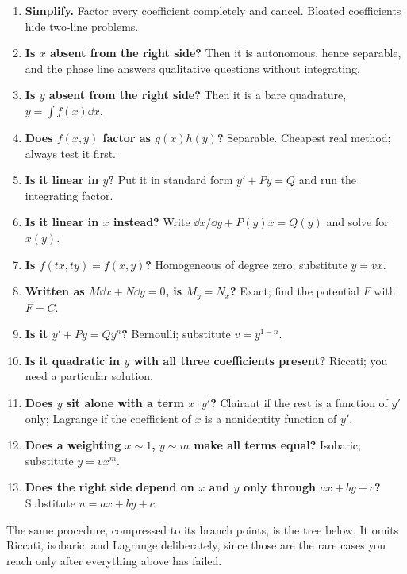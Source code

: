 \begin{enumerate}
\item \textbf{Simplify.} Factor every coefficient completely and cancel. Bloated coefficients hide two-line problems.
\item \textbf{Is $x$ absent from the right side?} Then it is autonomous, hence separable, and the phase line answers qualitative questions without integrating.
\item \textbf{Is $y$ absent from the right side?} Then it is a bare quadrature, $y=\int f(x)\dd x$.
\item \textbf{Does $f(x,y)$ factor as $g(x)h(y)$?} Separable. Cheapest real method; always test it first.
\item \textbf{Is it linear in $y$?} Put it in standard form $y'+Py=Q$ and run the integrating factor.
\item \textbf{Is it linear in $x$ instead?} Write $\dd x/\dd y+P(y)x=Q(y)$ and solve for $x(y)$.
\item \textbf{Is $f(tx,ty)=f(x,y)$?} Homogeneous of degree zero; substitute $y=vx$.
\item \textbf{Written as $M\dd x+N\dd y=0$, is $M_y=N_x$?} Exact; find the potential $F$ with $F=C$.
\item \textbf{Is it $y'+Py=Qy^{n}$?} Bernoulli; substitute $v=y^{1-n}$.
\item \textbf{Is it quadratic in $y$ with all three coefficients present?} Riccati; you need a particular solution.
\item \textbf{Does $y$ sit alone with a term $x\cdot y'$?} Clairaut if the rest is a function of $y'$ only; Lagrange if the coefficient of $x$ is a nonidentity function of $y'$.
\item \textbf{Does a weighting $x\sim1$, $y\sim m$ make all terms equal?} Isobaric; substitute $y=vx^{m}$.
\item \textbf{Does the right side depend on $x$ and $y$ only through $ax+by+c$?} Substitute $u=ax+by+c$.
\end{enumerate}

The same procedure, compressed to its branch points, is the tree below. It omits Riccati, isobaric, and Lagrange deliberately, since those are the rare cases you reach only after everything above has failed.

